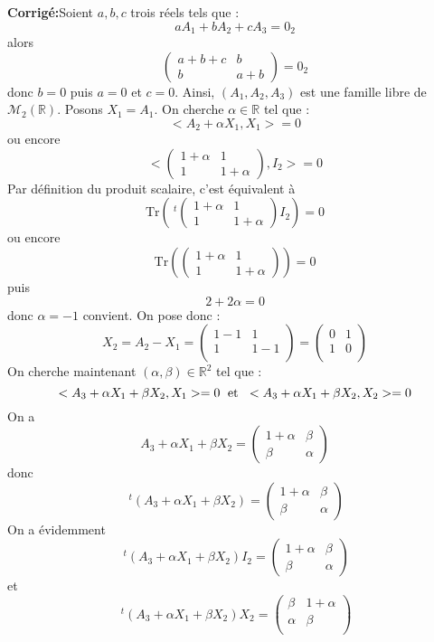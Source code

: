 \documentclass[a4paper,twoside,french,11pt]{VcCours}
\newcommand{\corr}{\textbf{Corrigé:}}
\begin{document}
\corr Soient $a,b,c$ trois réels tels que :
$$ a A_1+bA_2+cA_3= 0_2$$
alors 
$$ \begin{pmatrix}
a+b+c & b \\
b & a+b
\end{pmatrix}=0_2$$
donc $b=0$ puis $a=0$ et $c=0$. Ainsi, $(A_1,A_2,A_3)$ est une famille libre de $\mathcal{M}_2(\mathbb{R})$. Posons $X_1=A_1$. On cherche $\alpha \in \mathbb{R}$ tel que :
$$ <A_2+ \alpha X_1, X_1>=0$$
ou encore 
$$ <\begin{pmatrix}
1+ \alpha & 1 \\
1 & 1+ \alpha
\end{pmatrix}, I_2>=0$$
Par définition du produit scalaire, c'est équivalent à
$$ \textrm{Tr} \left( ~^t{\begin{pmatrix} 1+ \alpha & 1 \\
1 & 1+ \alpha
\end{pmatrix}} I_2 \right)=0$$
ou encore 
$$ \textrm{Tr} \left( \begin{pmatrix} 1+ \alpha & 1 \\
1 & 1+ \alpha
\end{pmatrix} \right)=0$$
puis
$$ 2+ 2 \alpha=0$$
donc $\alpha=-1$ convient. On pose donc :
$$ X_2 = A_2 - X_1 = \begin{pmatrix}
1-1 & 1 \\
1 & 1-1\\
\end{pmatrix}
 = \begin{pmatrix}
0 & 1 \\
1 & 0 \\
\end{pmatrix}$$
On cherche maintenant $(\alpha, \beta) \in \mathbb{R}^2$ tel que :
$$ <A_3+ \alpha X_1+ \beta X_2, X_1>=0 \; \hbox{ et } \; <A_3+ \alpha X_1+ \beta X_2, X_2>=0$$
On a 
$$ A_3+ \alpha X_1+ \beta X_2 = \begin{pmatrix}
1 + \alpha & \beta \\
\beta & \alpha
\end{pmatrix}$$
donc
$$ ~^t(A_3+ \alpha X_1+ \beta X_2)= \begin{pmatrix}
1 + \alpha & \beta \\
\beta & \alpha
\end{pmatrix}$$
On a évidemment
$$ ~^t(A_3+ \alpha X_1+ \beta X_2) I_2= \begin{pmatrix}
1 + \alpha & \beta \\
\beta & \alpha
\end{pmatrix}$$
et 
$$ ~^t(A_3+ \alpha X_1+ \beta X_2) X_2 = \begin{pmatrix}
\beta & 1 + \alpha \\
\alpha& \beta \\
\end{pmatrix}$$
\end{document}
